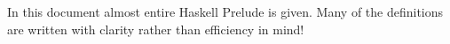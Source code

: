 \documentclass[a4paper, twoside, 8pt]{extarticle}
\begin{document}
\renewcommand{\footrulewidth}{0.4pt}
\fancyfoot[LF]{}

\begin{multicols*}{3}




In this document almost entire Haskell Prelude is given.
Many of the definitions are written with clarity rather than efficiency in mind!
\end{multicols*}
\end{document}
